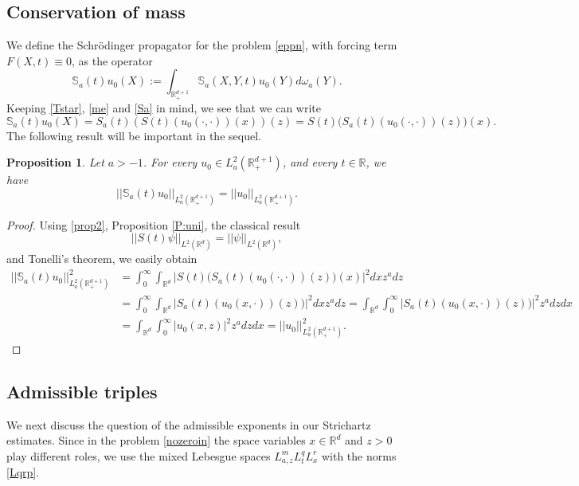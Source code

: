 \documentclass[11pt,letter]{amsart}
\def \RN {\mathbb{R}_+^{d+1}}
\def \R {\mathbb{R}}
\newcommand{\Rd}{\mathbb R^d}
\numberwithin{equation}{section}
\newtheorem{proposition}[theorem]{Proposition}
\numberwithin{equation}{section}
\begin{document}
\subsection{Conservation of mass} We define the Schr\"odinger propagator for the problem \eqref{eppn}, with forcing term $F(X,t) \equiv 0$, as the operator 
\begin{equation}\label{prop}
\mathbb S_a(t)u_0(X) := \int_{\RN} \mathbb S_a(X,Y,t) u_0(Y) d\omega_a(Y).
\end{equation} 
Keeping \eqref{Tstar},  \eqref{me} and \eqref{Sa} in mind, we see that we can write 
\begin{equation}\label{prop2}
\mathbb S_a(t)u_0(X) = S_a(t)(S(t)(u_0(\cdot,\cdot))(x))(z)= S(t)\big(S_a(t)(u_0(\cdot,\cdot))(z)\big)(x).
\end{equation}
The following result will be important in the sequel.

\begin{proposition} \label{P:Uni}
Let $a>-1$. For every $u_0\in L^2_a(\RN)$, and every $t\in \R$, we have
\[
||\mathbb S_a(t) u_0||_{L^2_a(\RN)} = ||u_0||_{L^2_a(\RN)}.
\]
\end{proposition}

\begin{proof}
Using \eqref{prop2}, Proposition \ref{P:uni}, the classical result 
\[
||S(t) \psi||_{L^2(\Rd)} = ||\psi||_{L^2(\Rd)},
\]
and Tonelli's theorem, we easily obtain 
\begin{align*}
||\mathbb S_a(t) u_0||^2_{L^2_a(\RN)} & = \int_0^\infty \int_{\Rd} |S(t)\big(S_a(t)(u_0(\cdot,\cdot))(z)\big)(x)|^2 dx z^a dz
\\
& = \int_0^\infty \int_{\Rd} |S_a(t)(u_0(x,\cdot))(z)\big)|^2 dx z^a dz =   \int_{\Rd} \int_0^\infty |S_a(t)(u_0(x,\cdot))(z)\big)|^2 z^a dz  dx 
\\
& = \int_{\Rd} \int_0^\infty |u_0(x,z)|^2 z^a dz  dx = ||u_0||^2_{L^2_a(\RN)}.
\end{align*}

\end{proof}



\vskip 0.2in

\subsection{Admissible triples}\label{S:ad}

We next discuss the question of the admissible exponents in our Strichartz estimates. Since in the problem \eqref{nozeroin} the space variables $x\in \Rd$ and $z>0$ play different roles, we use the mixed Lebesgue spaces $L^m_{a,z} L^q_t L^r_x $ with the norms \eqref{Lqrp}. 
\end{document}
